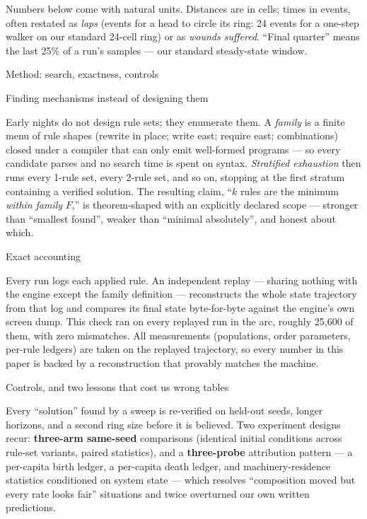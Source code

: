 Numbers below come with natural units. Distances are in cells;
times in events, often restated as {\it laps} (events for a head to
circle its ring: 24 events for a one-step walker on our standard
24-cell ring) or as {\it wounds suffered}. “Final quarter” means
the last 25\% of a run's samples --- our standard steady-state
window.

\sec Method: search, exactness, controls

\secc Finding mechanisms instead of designing them

Early nights do not design rule sets; they enumerate them. A {\it
family} is a finite menu of rule shapes (rewrite in place; write
east; require east; combinations) closed under a compiler that can
only emit well-formed programs --- so every candidate parses and no
search time is spent on syntax. {\it Stratified exhaustion} then
runs every 1-rule set, every 2-rule set, and so on, stopping at the
first stratum containing a verified solution. The resulting claim,
“$k$ rules are the minimum {\it within family} $F$,” is
theorem-shaped with an explicitly declared scope --- stronger than
“smallest found”, weaker than “minimal absolutely”, and honest
about which.

\secc Exact accounting

Every run logs each applied rule. An independent replay ---
sharing nothing with the engine except the family definition ---
reconstructs the whole state trajectory from that log and compares
its final state byte-for-byte against the engine's own screen
dump. This check ran on every replayed run in the arc, roughly
25{,}600 of them, with zero mismatches. All measurements
(populations, order parameters, per-rule ledgers) are taken on the
replayed trajectory, so every number in this paper is backed by a
reconstruction that provably matches the machine.

\secc Controls, and two lessons that cost us wrong tables

Every “solution” found by a sweep is re-verified on held-out
seeds, longer horizons, and a second ring size before it is
believed. Two experiment designs recur: {\bf three-arm same-seed}
comparisons (identical initial conditions across rule-set variants,
paired statistics), and a {\bf three-probe} attribution pattern ---
a per-capita birth ledger, a per-capita death ledger, and
machinery-residence statistics conditioned on system state ---
which resolves “composition moved but every rate looks fair”
situations and twice overturned our own written predictions.

